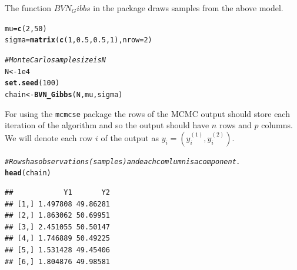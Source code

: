 \documentclass[11pt]{article}\usepackage[]{graphicx}\usepackage[]{color}
\makeatletter
\newcommand{\hlnum}[1]{\textcolor[rgb]{0.686,0.059,0.569}{#1}}%
\newcommand{\hlcom}[1]{\textcolor[rgb]{0.678,0.584,0.686}{\textit{#1}}}%
\newcommand{\hlstd}[1]{\textcolor[rgb]{0.345,0.345,0.345}{#1}}%
\newcommand{\hlkwb}[1]{\textcolor[rgb]{0.69,0.353,0.396}{#1}}%
\newcommand{\hlkwc}[1]{\textcolor[rgb]{0.333,0.667,0.333}{#1}}%
\newcommand{\hlkwd}[1]{\textcolor[rgb]{0.737,0.353,0.396}{\textbf{#1}}}%
\newenvironment{kframe}{%
 \def\at@end@of@kframe{}%
 \ifinner\ifhmode%
  \def\at@end@of@kframe{\end{minipage}}%
  \begin{minipage}{\columnwidth}%
 \fi\fi%
 \def\FrameCommand##1{\hskip\@totalleftmargin \hskip-\fboxsep
 \colorbox{shadecolor}{##1}\hskip-\fboxsep
     \hskip-\linewidth \hskip-\@totalleftmargin \hskip\columnwidth}%
 \MakeFramed {\advance\hsize-\width
   \@totalleftmargin\z@ \linewidth\hsize
   \@setminipage}}%
 {\par\unskip\endMakeFramed%
 \at@end@of@kframe}
\newenvironment{knitrout}{}{} %
\makeatother
\begin{document}
The function $BVN_Gibbs$ in the package draws samples from the above model. 

\begin{knitrout}
\color{fgcolor}\begin{kframe}
\begin{alltt}
\hlstd{mu} \hlkwb{=} \hlkwd{c}\hlstd{(}\hlnum{2}\hlstd{,} \hlnum{50}\hlstd{)}
\hlstd{sigma} \hlkwb{=} \hlkwd{matrix}\hlstd{(}\hlkwd{c}\hlstd{(}\hlnum{1}\hlstd{,} \hlnum{0.5}\hlstd{,} \hlnum{0.5}\hlstd{,} \hlnum{1}\hlstd{),} \hlkwc{nrow} \hlstd{=} \hlnum{2}\hlstd{)}

\hlcom{# Monte Carlo sample size is N}
\hlstd{N} \hlkwb{<-} \hlnum{1e4}
\hlkwd{set.seed}\hlstd{(}\hlnum{100}\hlstd{)}
\hlstd{chain} \hlkwb{<-} \hlkwd{BVN_Gibbs}\hlstd{(N, mu, sigma)}
\end{alltt}
\end{kframe}
\end{knitrout}

For using the \texttt{mcmcse} package the rows of the MCMC output should store each iteration of the algorithm and so the output should have $n$ rows and $p$ columns. We will denote each row $i$ of the output as $y_i = (y^{(1)}_i, y^{(2)}_i)$.

\begin{knitrout}
\color{fgcolor}\begin{kframe}
\begin{alltt}
\hlcom{#Rows has observations (samples) and each comlumn is a component. }
\hlkwd{head}\hlstd{(chain)}
\end{alltt}
\begin{verbatim}
##            Y1       Y2
## [1,] 1.497808 49.86281
## [2,] 1.863062 50.69951
## [3,] 2.451055 50.50147
## [4,] 1.746889 50.49225
## [5,] 1.531428 49.45406
## [6,] 1.804876 49.98581
\end{verbatim}
\end{kframe}
\end{knitrout}
\end{document}
